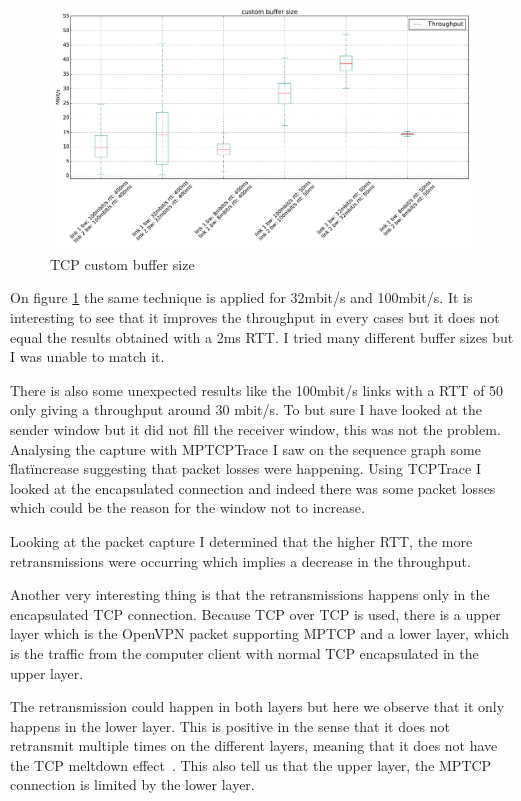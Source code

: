   \begin{figure}[h!]
    \centering
    \includegraphics[width=1\textwidth]{../results/tcp_all_custom_buffer.pdf}
    \caption{TCP custom buffer size}
    \label{tcp_all_custom_buffer}
  \end{figure}

On figure \ref{tcp_all_custom_buffer} the same technique is applied for 32mbit/s and 100mbit/s.
It is interesting to see that it improves the throughput in every cases but it does not equal the results obtained with a 2ms RTT.
I tried many different buffer sizes but I was unable to match it.

There is also some unexpected results like the 100mbit/s links with a RTT of 50 only giving a throughput around 30 mbit/s. To but sure I have looked at the sender window but
it did not fill the receiver window, this was not the problem. Analysing the capture with MPTCPTrace I saw on the sequence graph some \"flat\" increase
suggesting that packet losses were happening. Using TCPTrace I looked at the encapsulated connection and indeed there was some packet losses which could be the reason for the
window not to increase.

Looking at the packet capture I determined that the higher RTT, the more retransmissions were occurring which implies a decrease in the throughput.

Another very interesting thing is that the retransmissions happens only in the encapsulated TCP connection. Because TCP over TCP is used, there is a upper layer
which is the OpenVPN packet supporting MPTCP and a lower layer, which is the traffic from the computer client with normal TCP encapsulated in the upper layer.

The retransmission could happen in both layers but here we observe that it only happens in the lower layer.
This is positive in the sense that it does not retransmit multiple times on the different layers, meaning that it does not have the TCP meltdown effect~\cite{tcpovertcp}.
This also tell us that the upper layer, the MPTCP connection is limited by the lower layer.

